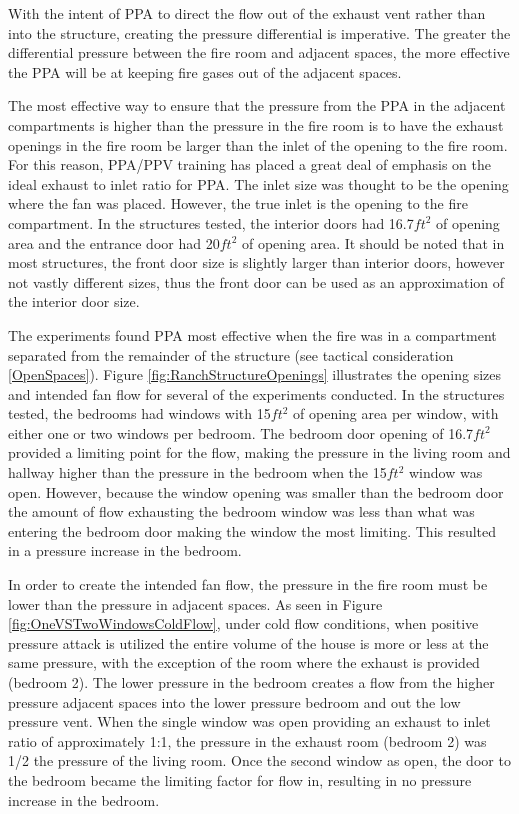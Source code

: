 \documentclass{article}
\begin{document}
With the intent of PPA to direct the flow out of the exhaust vent rather than into the structure, creating the pressure differential is imperative. The greater the differential pressure between the fire room and adjacent spaces, the more effective the PPA will be at keeping fire gases out of the adjacent spaces.

The most effective way to ensure that the pressure from the PPA in the adjacent compartments is higher than the pressure in the fire room is to have the exhaust openings in the fire room be larger than the inlet of the opening to the fire room.  For this reason, PPA/PPV training has placed a great deal of emphasis on the ideal exhaust to inlet ratio for PPA. The inlet size was thought to be the opening where the fan was placed. However, the true inlet is the opening to the fire compartment. In the structures tested, the interior doors had 16.7$ft^2$ of opening area and the entrance door had 20$ft^2$ of opening area. It should be noted that in most structures, the front door size is slightly larger than interior doors, however not vastly different sizes, thus the front door can be used as an approximation of the interior door size.

The experiments found PPA most effective when the fire was in a compartment separated from the remainder of the structure (see tactical consideration \ref{OpenSpaces}). Figure \ref{fig:RanchStructureOpenings} illustrates the opening sizes and intended fan flow for several of the experiments conducted. In the structures tested, the bedrooms had windows with 15$ft^2$ of opening area per window, with either one or two windows per bedroom. The bedroom door opening of 16.7$ft^2$ provided a limiting point for the flow, making the pressure in the living room and hallway higher than the pressure in the bedroom when the 15$ft^2$ window was open. However, because the window opening was smaller than the bedroom door the amount of flow exhausting the bedroom window was less than what was entering the bedroom door making the window the most limiting. This resulted in a pressure increase in the bedroom. 

In order to create the intended fan flow, the pressure in the fire room must be lower than the pressure in adjacent spaces. As seen in Figure \ref{fig:OneVSTwoWindowsColdFlow}, under cold flow conditions, when positive pressure attack is utilized the entire volume of the house is more or less at the same pressure, with the exception of the room where the exhaust is provided (bedroom 2). The lower pressure in the bedroom creates a flow from the higher pressure adjacent spaces into the lower pressure bedroom and out the low pressure vent. When the single window was open providing an exhaust to inlet ratio of approximately 1:1, the pressure in the exhaust room (bedroom 2) was 1/2 the pressure of the living room. Once the second window as open, the door to the bedroom became the limiting factor for flow in, resulting in no pressure increase in the bedroom.
\end{document}

